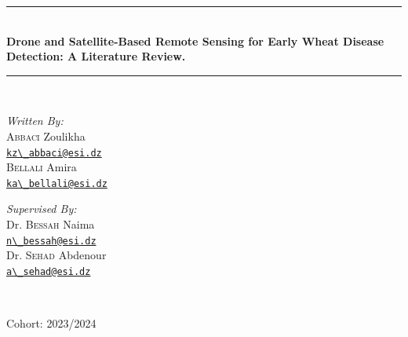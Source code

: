 {\begin{titlepage}
    \rule{\linewidth}{0.3mm} \\[0.4cm]
    {
    \Large \bfseries
    Drone and Satellite-Based Remote Sensing for Early Wheat Disease Detection: A Literature Review.\\
    }
    \rule{\linewidth}{0.3mm} \\[1cm]

    \vspace{10mm}

    \noindent
    \begin{minipage}{0.6\textwidth}
      \vspace{-7mm}
      \begin{flushleft} \large
        \emph{Written By:}\\
        \textsc{Abbaci} Zoulikha \\
        \href{mailto:kz_abbaci@esi.dz}{\verb!kz\_abbaci@esi.dz!} \\[0.3cm]
        \textsc{Bellali} Amira \\
        \href{mailto:ka_bellali@esi.dz}{\verb!ka\_bellali@esi.dz!}
      \end{flushleft}
    \end{minipage}
    \begin{minipage}{0.35\textwidth}
      \begin{flushright} \large
        \begin{flushleft} \large
          \emph{Supervised By:} \\
          Dr. \textsc{Bessah} Naima\\
          \href{mailto:n_bessah@esi.dz}{\verb!n\_bessah@esi.dz!}\\[0.3cm]
          Dr. \textsc{Sehad} Abdenour\\
          \href{mailto:a_sehad@esi.dz}{\verb!a\_sehad@esi.dz!}
        \end{flushleft}
      \end{flushright}
    \end{minipage}\\[1cm]


    \vfill

    {\large Cohort: 2023/2024}
  \end{titlepage}
  \restoregeometry
}
